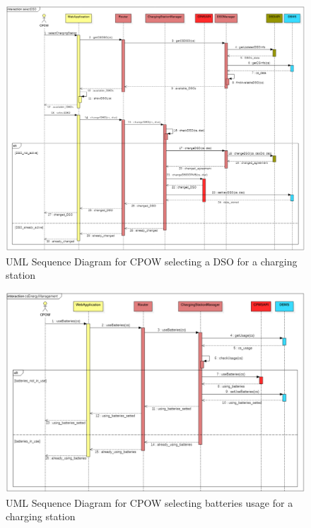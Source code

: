 \documentclass[a4paper]{report}
\begin{document}
\begin{landscape}
\begin{figure}[hp]
\centering
\includegraphics[scale=0.6]{img/sequenceSelectDSO.png}
\caption{UML Sequence Diagram for CPOW selecting a DSO for a charging station}
\label{fig:seq-selectDSO}
\end{figure}
\end{landscape}

\begin{landscape}
\begin{figure}[hp]
\centering
\includegraphics[scale=0.6]{img/sequenceCsEnergyManagement.png}
\caption{UML Sequence Diagram for CPOW selecting batteries usage for a charging station}
\label{fig:seq-energyManagement}
\end{figure}
\end{landscape}
\end{document}
